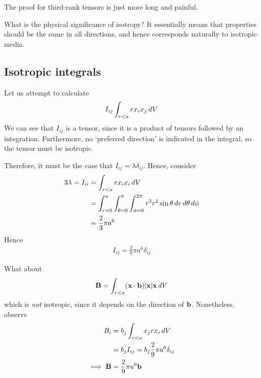 \documentclass{../../template/note}
\begin{document}
    The proof for third-rank tensors is just more long and painful.

    What is the physical significance of isotropy? It essentially means that properties should be the same in all directions, and hence corresponds naturally to isotropic media.

    \subsection{Isotropic integrals}

    \begin{example*}
        Let us attempt to calculate
        \begin{align*}
            I_{ij} \int_{r < a} rx_ix_j \,d{V}
        \end{align*}
        We can see that \(I_{ij}\) is a tensor, since it is a product of tensors followed by an integration. Furthermore, no `preferred direction' is indicated in the integral, so the tensor must be isotropic.

        Therefore, it must be the case that \(I_{ij} = \lambda \delta_{ij}\). Hence, consider
        \begin{align*}
            3\lambda = I_{ii} &= \int_{r < a} r x_i x_i \,d{V} \\
            &= \int_{r=0}^a \int_{\theta=0}^{\pi} \int_{\phi=0}^{2\pi} r^3 r^2 \sin \theta \,d{r} \,d{\theta} \,d{\phi} \\
            &= \frac{2}{3}\pi a^6
        \end{align*}
        Hence
        \begin{align*}
            I_{ij} = \frac 2 9 \pi a^6 \delta_{ij}
        \end{align*}
    \end{example*}
    
    \begin{example*}
        What about
        \begin{align*}
            \V B = \int_{r < a} (\V x \cdot \V b)|\V x|\V x \D V
        \end{align*}
        which is \emph{not} isotropic, since it depends on the direction of \(\V b\). Nonetheless, observe
        \begin{align*}
            B_i &= b_j \int_{r < a} x_j r x_i \D V \\
            &= b_j I_{ij} = b_j \frac 2 9 \pi a^6 \delta_{ij} \\
            \implies \V B &= \frac 2 9 \pi a^6 \V b
        \end{align*}
    \end{example*}
    
\end{document}
